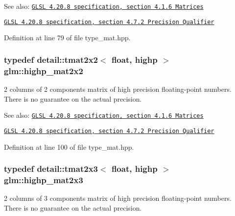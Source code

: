 \begin{Desc}
\item[See also:]\href{http://www.opengl.org/registry/doc/GLSLangSpec.4.20.8.pdf}{\tt GLSL 4.20.8 specification, section 4.1.6 Matrices} 

\href{http://www.opengl.org/registry/doc/GLSLangSpec.4.20.8.pdf}{\tt GLSL 4.20.8 specification, section 4.7.2 Precision Qualifier} \end{Desc}


Definition at line 79 of file type\_\-mat.hpp.\hypertarget{group__core__precision_g694146b8d430b22caa8b37571d9bc8bc}{
\subsubsection[highp\_\-mat2x2]{\setlength{\rightskip}{0pt plus 5cm}typedef detail::tmat2x2$<$ float, highp $>$ {\bf glm::highp\_\-mat2x2}}}
\label{group__core__precision_g694146b8d430b22caa8b37571d9bc8bc}


2 columns of 2 components matrix of high precision floating-point numbers. There is no guarantee on the actual precision.

\begin{Desc}
\item[See also:]\href{http://www.opengl.org/registry/doc/GLSLangSpec.4.20.8.pdf}{\tt GLSL 4.20.8 specification, section 4.1.6 Matrices} 

\href{http://www.opengl.org/registry/doc/GLSLangSpec.4.20.8.pdf}{\tt GLSL 4.20.8 specification, section 4.7.2 Precision Qualifier} \end{Desc}


Definition at line 100 of file type\_\-mat.hpp.\hypertarget{group__core__precision_g7d4e5a1c803be5688c75241c924dfa58}{
\subsubsection[highp\_\-mat2x3]{\setlength{\rightskip}{0pt plus 5cm}typedef detail::tmat2x3$<$ float, highp $>$ {\bf glm::highp\_\-mat2x3}}}
\label{group__core__precision_g7d4e5a1c803be5688c75241c924dfa58}


2 columns of 3 components matrix of high precision floating-point numbers. There is no guarantee on the actual precision.

